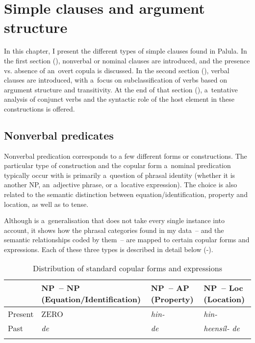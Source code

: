 \chapter{Simple clauses and argument structure}
\label{chap:12}

In this chapter, I present the different types of simple clauses found in Palula. In the first section (), nonverbal or nominal clauses are introduced, and the presence vs. absence of an~overt copula is discussed. In the second section (), verbal clauses are introduced, with a~focus on subclassification of verbs based on argument structure and transitivity. At the end of that section (), a~tentative analysis of conjunct verbs and the syntactic role of the host element in these constructions is offered. 


\section{Nonverbal predicates}
\label{sec:12-1}

Nonverbal predication corresponds to a few different forms or constructions. The particular type of construction and the copular form a~nominal predication typically occur with is primarily a~question of phrasal identity (whether it is another NP, an~adjective phrase, or a~locative expression). The choice is also related to the semantic distinction between equation/identification, property and location, as well as to tense.


Although  is a~generalisation that does not take every single instance into account, it shows how the phrasal categories found in my data~-- and the semantic relationships coded by them~-- are mapped to certain copular forms and expressions. Each of these three types is described in detail below (-).


\begin{table}[ht]
\caption{Distribution of standard copular forms and expressions}
\begin{tabularx}{\textwidth}{ l Q Q Q }
\lsptoprule
&
NP~-- NP
(Equation/{\allowbreak}Identification) &
NP~-- AP
(Property) &
NP~-- Loc
(Location)\\\hline
Present &
ZERO &
\textit{hin-} &
\textit{hin-}\\
Past &
\textit{de} &
\textit{de} &
\textit{heensíl- de}\\\lspbottomrule
\end{tabularx}
\label{tab:12-1}
\end{table}

